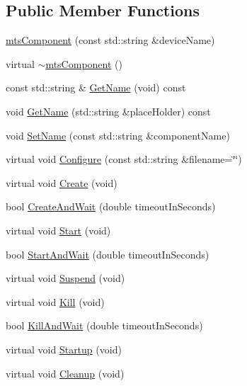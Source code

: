 \subsection*{Public Member Functions}
\begin{DoxyCompactItemize}
\item 
\hyperlink{classmts_component_ac465bee698692fda1ed1b473961a7daf}{mts\-Component} (const std\-::string \&device\-Name)
\item 
virtual \hyperlink{classmts_component_ad9bddad895d74bb29d193e4ce8f00a72}{$\sim$mts\-Component} ()
\item 
const std\-::string \& \hyperlink{classmts_component_aafd5586590dbc734cd48159907d716da}{Get\-Name} (void) const 
\item 
void \hyperlink{classmts_component_ab52b677b49c90557944a3d09dcc433a8}{Get\-Name} (std\-::string \&place\-Holder) const 
\item 
void \hyperlink{classmts_component_adf1bfb6381d23dc9b771d614e64ab65d}{Set\-Name} (const std\-::string \&component\-Name)
\item 
virtual void \hyperlink{classmts_component_ad872432876de7879dc96c232b411c146}{Configure} (const std\-::string \&filename=\char`\"{}\char`\"{})
\item 
virtual void \hyperlink{classmts_component_a7e8a723ce2fa2ed12b2fb4095ca6feec}{Create} (void)
\item 
bool \hyperlink{classmts_component_a143bee124e9caf72db28dc453da7d9f1}{Create\-And\-Wait} (double timeout\-In\-Seconds)
\item 
virtual void \hyperlink{classmts_component_abfb4a63739ec45a9cdb91e3363db7c5c}{Start} (void)
\item 
bool \hyperlink{classmts_component_a2d9a0ec39e9dda62891234cab5c4f387}{Start\-And\-Wait} (double timeout\-In\-Seconds)
\item 
virtual void \hyperlink{classmts_component_a7264642eb5c56729d1f80263e0e1152b}{Suspend} (void)
\item 
virtual void \hyperlink{classmts_component_a8c874182b54438abb963b755c3b27f95}{Kill} (void)
\item 
bool \hyperlink{classmts_component_a35f743f82339df699b5939dfbb724677}{Kill\-And\-Wait} (double timeout\-In\-Seconds)
\item 
virtual void \hyperlink{classmts_component_aaf28f0262b44eb6866e10089a02fa6e4}{Startup} (void)
\item 
virtual void \hyperlink{classmts_component_a891f330f4fde7d831dcf7dc537dc5e81}{Cleanup} (void)
\item 

\end{DoxyCompactItemize}
